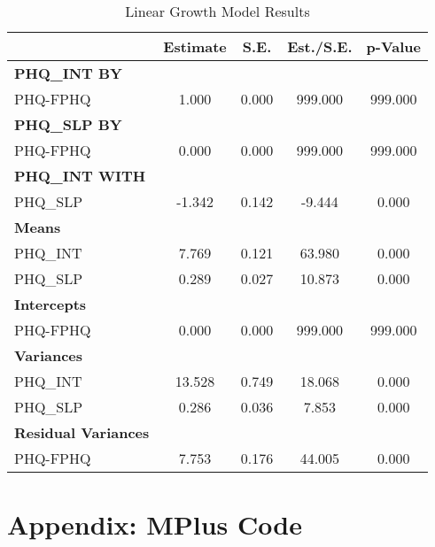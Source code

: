 \documentclass[11pt]{article}
\begin{document}
\begin{table}[htbp!]
    \centering
    \caption{Linear Growth Model Results} \label{tab:Model Results}
    \begin{tabular}{l c c c c}
        \toprule
        & Estimate & S.E. & Est./S.E. & p-Value \\
        \midrule
        \textbf{PHQ\_INT BY} & & & & \\
        PHQ-FPHQ & 1.000 & 0.000 & 999.000 & 999.000 \\
        \midrule
        \textbf{PHQ\_SLP BY} & & & & \\
        PHQ-FPHQ & 0.000 & 0.000 & 999.000 & 999.000 \\
        \midrule
        \textbf{PHQ\_INT WITH} & & & & \\
        PHQ\_SLP & -1.342 & 0.142 & -9.444 & 0.000 \\
        \midrule
        \textbf{Means} & & & & \\
        PHQ\_INT & 7.769 & 0.121 & 63.980 & 0.000 \\
        PHQ\_SLP & 0.289 & 0.027 & 10.873 & 0.000 \\
        \midrule
        \textbf{Intercepts} & & & & \\
        PHQ-FPHQ & 0.000 & 0.000 & 999.000 & 999.000 \\
        \midrule
        \textbf{Variances} & & & & \\
        PHQ\_INT & 13.528 & 0.749 & 18.068 & 0.000 \\
        PHQ\_SLP & 0.286 & 0.036 & 7.853 & 0.000 \\
        \midrule
        \textbf{Residual Variances} & & & & \\
        PHQ-FPHQ & 7.753 & 0.176 & 44.005 & 0.000 \\
        \bottomrule
    \end{tabular}
\end{table}

\FloatBarrier

\newpage

\section{Appendix: MPlus Code}
\end{document}
